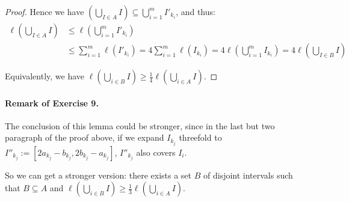 \documentclass[a4paper, linespread=1.5]{article}
\begin{document}
\begin{proof}
        Hence we have $(\bigcup_{I \in A} I) \subseteq \bigcup_{i = 1}^m I'_{k_i}$, and thus:
        \begin{align*}
            \ell(\bigcup_{I \in A} I) &\leqslant \ell(\bigcup_{i = 1}^m I'_{k_i}) \\
            &\leqslant \sum_{i = 1}^m \ell(I'_{k_i}) = 4 \sum_{i = 1}^m \ell(I_{k_i}) = 4 \ell(\bigcup_{i = 1}^m I_{k_i}) = 4\ell(\bigcup_{I \in B} I)
        \end{align*}
        
        Equivalently, we have $\ell(\bigcup_{i \in B} I) \geqslant \frac{1}{4} \ell(\bigcup_{i \in A} I)$.
    \end{proof}

    \paragraph*{Remark of Exercise 9.}
        The conclusion of this lemma could be stronger, since in the last but two paragraph of the proof above, if we expand $I_{k_j}$ threefold to $I''_{k_j} := [2a_{k_j} - b_{k_j}, 2b_{k_j} - a_{k_j}]$, $I''_{k_j}$ also covers $I_i$.
        
        So we can get a stronger version: there exists a set $B$ of disjoint intervals such that $B \subseteq A$ and $\ell(\bigcup_{i \in B} I) \geqslant \frac{1}{3} \ell(\bigcup_{i \in A} I)$.
\end{document}
